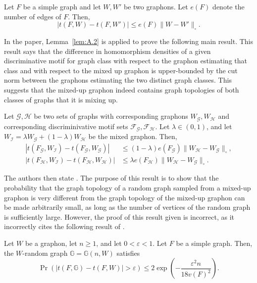 \begin{lemma}\label{lem:A.2}
Let $F$ be a simple graph and let $W,W'$ be two graphons. Let $e(F)$ denote the number of edges of $F$. Then,
\[|t(F,W)-t(F,W')|\leq e(F)\lVert W-W'\rVert_{\square}.\]
\end{lemma}



In the paper, Lemma~\ref{lem:A.2} is applied to prove the following main result. This result says that the difference in homomorphism densities of a given discriminative motif for graph class with respect to the graphon estimating that class and with respect to the mixed up graphon is upper-bounded by the cut norm between the graphons estimating the two distinct graph classes. This suggests that the mixed-up graphon indeed contains graph topologies of both classes of graphs that it is mixing up.

\begin{theorem}\label{thm:4.2}
Let $\mathcal{G},\mathcal{H}$ be two sets of graphs with corresponding graphons $W_{\mathcal{G}},W_{\mathcal{H}}$ and corresponding discriminivative motif sets $\mathcal{F}_{\mathcal{G}},\mathcal{F}_{\mathcal{H}}$. Let $\lambda\in (0,1)$, and let $W_{\mathcal{I}}=\lambda W_{\mathcal{G}}+ (1-\lambda)W_{\mathcal{H}}$ be the mixed graphon. Then,
\begin{align*}
    |t(F_\mathcal{G},W_{\mathcal{I}})-t(F_\mathcal{G},W_{\mathcal{G}})|&\leq (1-\lambda) e(F_{\mathcal{G}})\lVert W_{\mathcal{H}}-W_{\mathcal{G}}\rVert_\square,\\
    |t(F_{\mathcal{H}},W_{\mathcal{I}})-t(F_\mathcal{H},W_{\mathcal{H}})|&\leq\lambda e(F_\mathcal{H})\lVert W_\mathcal{H}-W_\mathcal{G}\rVert_\square.
\end{align*}
\end{theorem}



The authors then state \cite[Theorem 4.3]{Han:2022}.
The purpose of this result is to show that the probability that the graph topology of a random graph sampled from a mixed-up graphon is very different from the graph topology of the mixed-up graphon can be made arbitrarily small, as long as the number of vertices of the random graph is sufficiently large. However, the proof of this result given is incorrect, as it incorrectly cites the following result of \cite{Lovasz:2006}.

\begin{lemma}\label{lem:L-S thm 2.5}
Let $W$ be a graphon, let $n\geq 1$, and let $0<\varepsilon<1$. Let $F$ be a simple graph. Then, the $W$-random graph $\mathbb{G}=\mathbb{G}(n,W)$ satisfies
\[\Pr(|t(F,\mathbb{G})-t(F,W)|>\varepsilon)\leq 2\exp\left(-\frac{\varepsilon^2n}{18 v(F)^2}\right).\]
\end{lemma}

